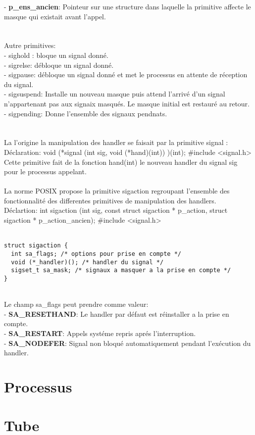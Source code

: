 \documentclass[a4paper,12pt,openany]{book}
\begin{document}
- \textbf{p_ens_ancien}: Pointeur sur une structure dans laquelle la primitive affecte le masque qui existait avant l'appel.\\
\\
\\
Autre primitives:\\
- sighold : bloque un signal donné.\\
- sigrelse: débloque un signal donné.\\
- sigpause: débloque un signal donné et met le processus en attente de réception du signal.\\
- sigsuspend: Installe un nouveau masque puis attend l'arrivé d'un signal n'appartenant pas aux signaix masqués. Le masque initial est restauré au retour.\\
- sigpending: Donne l'ensemble des signaux pendnats.\\
\\
\\
La l'origine la manipulation des handler se faisait par la primitive signal :\\
Déclaration: void (*signal (int sig, void (*hand)(int)) )(int); #include <signal.h>\\
Cette primitive fait de la fonction hand(int) le nouveau handler du signal sig pour le processus appelant.\\
\\
La norme POSIX propose la primitive sigaction regroupant l'ensemble des fonctionnalité des differentes primitives de manipulation des handlers.\\
Déclartion: int sigaction (int sig, const struct sigaction * p_action, struct sigaction * p_action_ancien); #include <signal.h>\\
\\
\begin{verbatim}
struct sigaction {
  int sa_flags; /* options pour prise en compte */
  void (*_handler)(); /* handler du signal */
  sigset_t sa_mask; /* signaux a masquer a la prise en compte */
}
\end{verbatim}
\\
Le champ sa_flags peut prendre comme valeur:\\
- \textbf{SA_RESETHAND}: Le handler par défaut est réinstaller a la prise en compte.\\
- \textbf{SA_RESTART}: Appels systéme repris aprés l'interruption.\\
- \textbf{SA_NODEFER}: Signal non bloqué automatiquement pendant l'exécution du handler.\\


\nexpage

\chapter{Processus}



\nexpage

\chapter{Tube}
\end{document}
